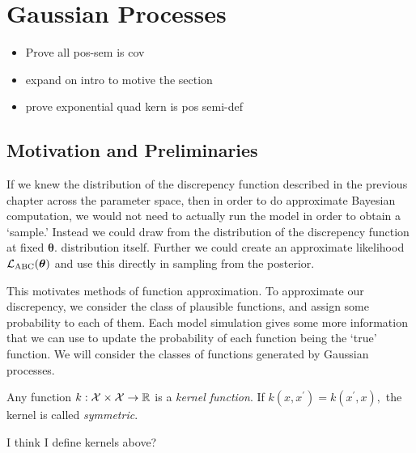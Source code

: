 \chapter{Gaussian Processes}

\begin{itemize}
    \item Prove all pos-sem is cov
    \item expand on intro to motive the section
    \item prove exponential quad kern is pos semi-def
\end{itemize}

\section{Motivation and Preliminaries}

If we knew the distribution of the discrepency function described in the
previous chapter across the parameter space, then in order to do approximate
Bayesian computation, we would not need to actually run the model in order to
obtain a `sample.' Instead we could draw from the distribution of the
discrepency function at fixed $\bm\theta.$ distribution itself. Further we
could create an approximate likelihood $\mathcal{L}_\text{ABC}(\bm\theta)$ and use this directly
in sampling from the posterior.

This motivates methods of function approximation. To approximate our
discrepency, we consider the class of plausible functions, and assign some
probability to each of them. Each model simulation gives some more information
that we can use to update the probability of each function being the `true'
function. We will consider the classes of functions generated by Gaussian
processes.

\color{red}
\begin{definition}\label{def:kernel}
    Any function $k:\mathcal{X}\times\mathcal{X}\to\mathbb{R}$ is a
    \emph{kernel function}. If $k(x, x^\prime) = k(x^\prime, x),$ the kernel is
    called \emph{symmetric}.
\end{definition}

I think I define kernels above?

\color{black}

